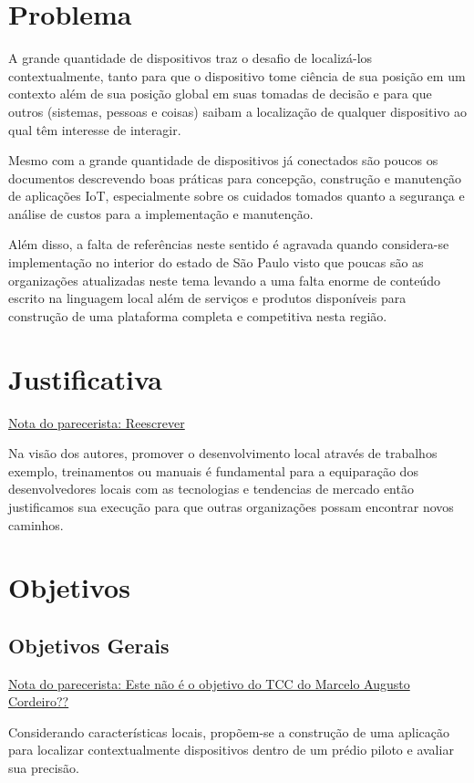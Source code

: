 \documentclass[
	12pt,				%
	openright,			%
	oneside,			%
	a4paper,			%
	chapter=TITLE,		%
	english,			%
	french,				%
	spanish,			%
	brazil				%
	]{abntex2}
\begin{document}
{\chapter{Problema}
A grande quantidade de dispositivos traz o desafio de localizá-los contextualmente, tanto para que o dispositivo tome ciência de sua posição em um contexto além de sua posição global em suas tomadas de decisão e para que outros (sistemas, pessoas e coisas) saibam a localização de qualquer dispositivo ao qual têm interesse de interagir.

Mesmo com a grande quantidade de dispositivos já conectados são poucos os documentos descrevendo boas práticas para concepção, construção e manutenção de aplicações IoT, especialmente sobre os cuidados tomados quanto a segurança e análise de custos para a implementação e manutenção.

Além disso, a falta de referências neste sentido é agravada quando considera-se implementação no interior do estado de São Paulo visto que poucas são as organizações atualizadas neste tema levando a uma falta enorme de conteúdo escrito na linguagem local além de serviços e produtos disponíveis para construção de uma plataforma completa e competitiva nesta região.

\chapter{Justificativa}

\underline{Nota do parecerista: Reescrever}

Na visão dos autores, promover o desenvolvimento local através de trabalhos exemplo, treinamentos ou manuais é fundamental para a equiparação dos desenvolvedores locais com as tecnologias e tendencias de mercado então justificamos sua execução para que outras organizações possam encontrar novos caminhos.

\chapter{Objetivos}

\section{Objetivos Gerais}

\underline{Nota do parecerista: Este não é o objetivo do TCC do Marcelo Augusto Cordeiro??}

Considerando características locais, propõem-se a construção de uma aplicação para localizar contextualmente dispositivos dentro de um prédio piloto e avaliar sua precisão.

}
\end{document}
